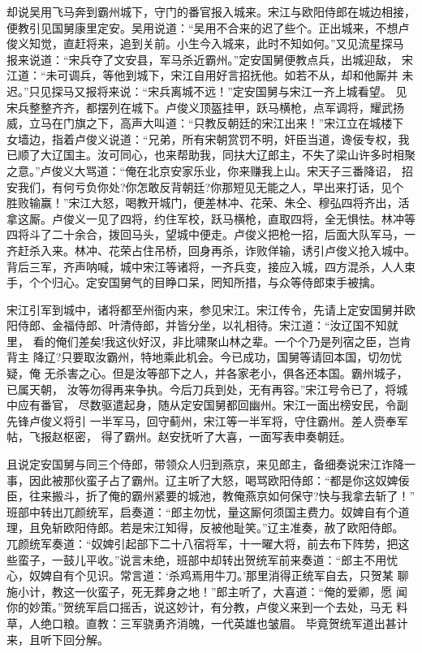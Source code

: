 却说吴用飞马奔到霸州城下，守门的番官报入城来。宋江与欧阳侍郎在城边相接，
便教引见国舅康里定安。吴用说道：“吴用不合来的迟了些个。正出城来，不想卢
俊义知觉，直赶将来，追到关前。小生今入城来，此时不知如何。”又见流星探马
报来说道：“宋兵夺了文安县，军马杀近霸州。”定安国舅便教点兵，出城迎敌，
宋江道：“未可调兵，等他到城下，宋江自用好言招抚他。如若不从，却和他厮并
未迟。”只见探马又报将来说：“宋兵离城不远！”定安国舅与宋江一齐上城看望。
见宋兵整整齐齐，都摆列在城下。卢俊义顶盔挂甲，跃马横枪，点军调将，耀武扬
威，立马在门旗之下，高声大叫道：“只教反朝廷的宋江出来！”宋江立在城楼下
女墙边，指着卢俊义说道：“兄弟，所有宋朝赏罚不明，奸臣当道，谗佞专权，我
已顺了大辽国主。汝可同心，也来帮助我，同扶大辽郎主，不失了梁山许多时相聚
之意。”卢俊义大骂道：“俺在北京安家乐业，你来赚我上山。宋天子三番降诏，
招安我们，有何亏负你处?你怎敢反背朝廷?你那短见无能之人，早出来打话，见个
胜败输赢！”宋江大怒，喝教开城门，便差林冲、花荣、朱仝、穆弘四将齐出，活
拿这厮。卢俊义一见了四将，约住军校，跃马横枪，直取四将，全无惧怯。林冲等
四将斗了二十余合，拨回马头，望城中便走。卢俊义把枪一招，后面大队军马，一
齐赶杀入来。林冲、花荣占住吊桥，回身再杀，诈败佯输，诱引卢俊义抢入城中。
背后三军，齐声呐喊，城中宋江等诸将，一齐兵变，接应入城，四方混杀，人人束
手，个个归心。定安国舅气的目睁口呆，罔知所措，与众等侍郎束手被擒。

宋江引军到城中，诸将都至州衙内来，参见宋江。宋江传令，先请上定安国舅并欧
阳侍郎、金福侍郎、叶清侍郎，并皆分坐，以礼相待。宋江道：“汝辽国不知就里，
看的俺们差矣!我这伙好汉，非比啸聚山林之辈。一个个乃是列宿之臣，岂肯背主
降辽?只要取汝霸州，特地乘此机会。今已成功，国舅等请回本国，切勿忧疑，俺
无杀害之心。但是汝等部下之人，并各家老小，俱各还本国。霸州城子，已属天朝，
汝等勿得再来争执。今后刀兵到处，无有再容。”宋江号令已了，将城中应有番官，
尽数驱遣起身，随从定安国舅都回幽州。宋江一面出榜安民，令副先锋卢俊义将引
一半军马，回守蓟州，宋江等一半军将，守住霸州。差人赍奉军帖，飞报赵枢密，
得了霸州。赵安抚听了大喜，一面写表申奏朝廷。

且说定安国舅与同三个侍郎，带领众人归到燕京，来见郎主，备细奏说宋江诈降一
事，因此被那伙蛮子占了霸州。辽主听了大怒，喝骂欧阳侍郎：“都是你这奴婢佞
臣，往来搬斗，折了俺的霸州紧要的城池，教俺燕京如何保守?快与我拿去斩了！”
班部中转出兀颜统军，启奏道：“郎主勿忧，量这厮何须国主费力。奴婢自有个道
理，且免斩欧阳侍郎。若是宋江知得，反被他耻笑。”辽主准奏，赦了欧阳侍郎。
兀颜统军奏道：“奴婢引起部下二十八宿将军，十一曜大将，前去布下阵势，把这
些蛮子，一鼓儿平收。”说言未绝，班部中却转出贺统军前来奏道：“郎主不用忧
心，奴婢自有个见识。常言道：‘杀鸡焉用牛刀。’那里消得正统军自去，只贺某
聊施小计，教这一伙蛮子，死无葬身之地！”郎主听了，大喜道：“俺的爱卿，愿
闻你的妙策。”贺统军启口摇舌，说这妙计，有分教，卢俊义来到一个去处，马无
料草，人绝口粮。直教：三军骁勇齐消魄，一代英雄也皱眉。
毕竟贺统军道出甚计来，且听下回分解。